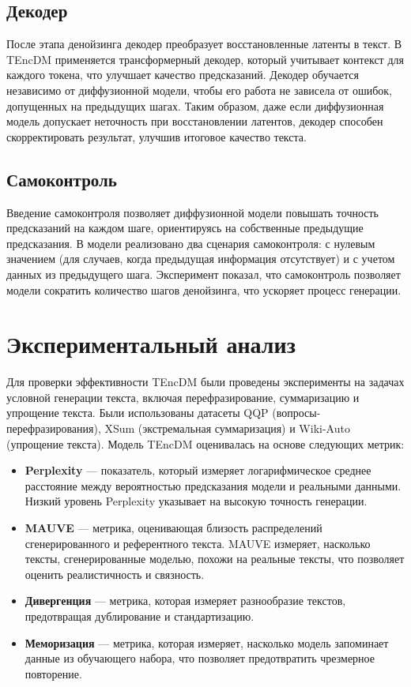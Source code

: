 \documentclass[a4paper, 12pt]{article}
\begin{document}
\subsection{Декодер}
После этапа денойзинга декодер преобразует восстановленные латенты в текст. В TEncDM применяется трансформерный декодер, который учитывает контекст для каждого токена, что улучшает качество предсказаний. Декодер обучается независимо от диффузионной модели, чтобы его работа не зависела от ошибок, допущенных на предыдущих шагах. Таким образом, даже если диффузионная модель допускает неточность при восстановлении латентов, декодер способен скорректировать результат, улучшив итоговое качество текста.

\subsection{Самоконтроль}
Введение самоконтроля позволяет диффузионной модели повышать точность предсказаний на каждом шаге, ориентируясь на собственные предыдущие предсказания. В модели реализовано два сценария самоконтроля: с нулевым значением (для случаев, когда предыдущая информация отсутствует) и с учетом данных из предыдущего шага. Эксперимент показал, что самоконтроль позволяет модели сократить количество шагов денойзинга, что ускоряет процесс генерации.

\section{Экспериментальный анализ}
Для проверки эффективности TEncDM были проведены эксперименты на задачах условной генерации текста, включая перефразирование, суммаризацию и упрощение текста. Были использованы датасеты QQP \cite{qqp} (вопросы-перефразирования), XSum \cite{xsum} (экстремальная суммаризация) и Wiki-Auto \cite{wiki_auto} (упрощение текста). Модель TEncDM оценивалась на основе следующих метрик:

\begin{itemize}
    \item \textbf{Perplexity} — показатель, который измеряет логарифмическое среднее расстояние между вероятностью предсказания модели и реальными данными. Низкий уровень Perplexity указывает на высокую точность генерации.
    \item \textbf{MAUVE} — метрика, оценивающая близость распределений сгенерированного и референтного текста. MAUVE измеряет, насколько тексты, сгенерированные моделью, похожи на реальные тексты, что позволяет оценить реалистичность и связность.
    \item \textbf{Дивергенция} — метрика, которая измеряет разнообразие текстов, предотвращая дублирование и стандартизацию.
    \item \textbf{Меморизация} — метрика, которая измеряет, насколько модель запоминает данные из обучающего набора, что позволяет предотвратить чрезмерное повторение.
\end{itemize}
\end{document}
